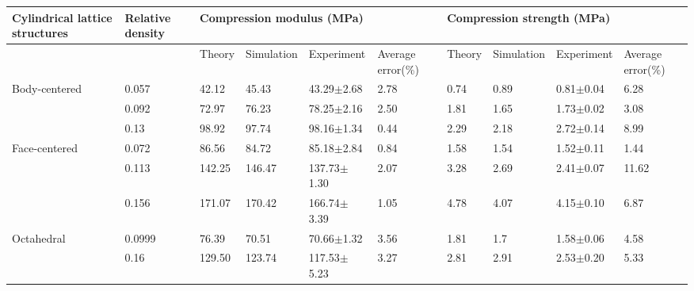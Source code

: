 \documentclass{article} %
\begin{document}
\begin{tabular}{|p{0.5in}|p{0.4in}|p{0.4in}|p{0.5in}|p{0.6in}|p{0.4in}|p{0.4in}|p{0.5in}|p{0.6in}|p{0.4in}|} \hline 
Cylindrical lattice structures & Relative density & \multicolumn{4}{|p{1.9in}|}{Compression modulus (MPa)} & \multicolumn{4}{|p{1.9in}|}{Compression strength (MPa)} \\ \hline 
 &  & Theory & Simulation & Experiment & Average error(\%) & Theory & Simulation & Experiment & Average error\newline (\%) \\ \hline 
Body-centered & 0.057 & 42.12 & 45.43 & 43.29\newline $\mathrm{\pm}$2.68 & 2.78 & 0.74 & 0.89 & 0.81\newline $\mathrm{\pm}$0.04 & 6.28 \\ \hline 
 & 0.092 & 72.97 & 76.23 & 78.25\newline $\mathrm{\pm}$2.16 & 2.50 & 1.81 & 1.65 & 1.73\newline $\mathrm{\pm}$0.02 & 3.08 \\ \hline 
 & 0.13 & 98.92 & 97.74 & 98.16\newline $\mathrm{\pm}$1.34 & 0.44 & 2.29 & 2.18 & 2.72\newline $\mathrm{\pm}$0.14 & 8.99 \\ \hline 
Face-centered & 0.072 & 86.56 & 84.72 & 85.18\newline $\mathrm{\pm}$2.84 & 0.84 & 1.58 & 1.54 & 1.52\newline $\mathrm{\pm}$0.11 & 1.44 \\ \hline 
 & 0.113 & 142.25 & 146.47 & 137.73\newline $\mathrm{\pm}$1.30 & 2.07 & 3.28 & 2.69 & 2.41\newline $\mathrm{\pm}$0.07 & 11.62 \\ \hline 
 & 0.156 & 171.07 & 170.42 & 166.74\newline $\mathrm{\pm}$3.39 & 1.05 & 4.78 & 4.07 & 4.15\newline $\mathrm{\pm}$0.10 & 6.87 \\ \hline 
Octahedral & 0.0999 & 76.39 & 70.51 & 70.66\newline $\mathrm{\pm}$1.32 & 3.56 & 1.81 & 1.7 & 1.58\newline $\mathrm{\pm}$0.06 & 4.58 \\ \hline 
 & 0.16 & 129.50 & 123.74 & 117.53\newline $\mathrm{\pm}$5.23 & 3.27 & 2.81 & 2.91 & 2.53\newline $\mathrm{\pm}$0.20 & 5.33 \\ \hline 

\end{tabular}
\end{document}
